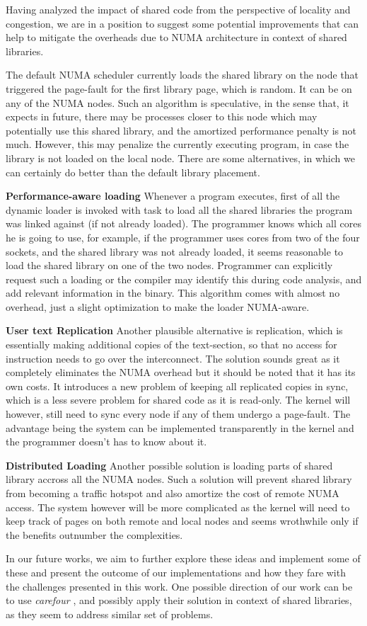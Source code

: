
Having analyzed the impact of shared code from the perspective of locality and congestion,
we are in a position to suggest some potential improvements that can help to mitigate the
overheads due to NUMA architecture in context of shared libraries.

The default NUMA scheduler currently loads the shared library on the node that triggered
the page-fault for the first library page, which is random. It can be on any of the NUMA nodes.
Such an algorithm is speculative, in the sense that, it expects in future, there may be processes
closer to this node which may potentially use this shared library, and the amortized performance
penalty is not much. However, this may penalize the currently executing program, in case the library
is not loaded on the local node. There are some alternatives, in which we can certainly do better
than the default library placement.

\textbf{Performance-aware loading} Whenever a program executes, first of all the dynamic loader is
invoked with task to load all the shared libraries the program was linked against (if not already loaded).
The programmer knows which all cores he is going to use, for example, if the programmer uses cores from 
two of the four sockets, and the shared library was not already loaded, it seems reasonable to load
the shared library on one of the two nodes. Programmer can explicitly request such a loading or the
compiler may identify this during code analysis, and add relevant information in the binary. This
algorithm comes with almost no overhead, just a slight optimization to make the loader NUMA-aware.

\textbf{User text Replication} Another plausible alternative is replication, which is essentially making
additional copies of the text-section, so that no access for instruction needs to go over the interconnect.
The solution sounds great as it completely eliminates the NUMA overhead but it should be noted that it has
its own costs. It introduces a new problem of keeping all replicated copies in sync, which is a less severe
problem for shared code as it is read-only. The kernel will however, still need to sync every node if any 
of them undergo a page-fault. The advantage being the system can be implemented transparently in the
kernel and the programmer doesn't has to know about it.

\textbf{Distributed Loading} Another possible solution is loading parts of shared library accross all the
NUMA nodes. Such a solution will prevent shared library from becoming a traffic hotspot and also amortize
the cost of remote NUMA access. The system however will be more complicated as the kernel will need to
keep track of pages on both remote and local nodes and seems wrothwhile only if the benefits outnumber the
complexities.

In our future works, we aim to further explore these ideas and implement some of these and present the
outcome of our implementations and how they fare with the challenges presented in this work. One possible
direction of our work can be to use \textit{carefour} \cite{Dashti:2013:TMH:2490301.2451157}, and possibly 
apply their solution in context of shared libraries, as they seem to address similar set of problems.

